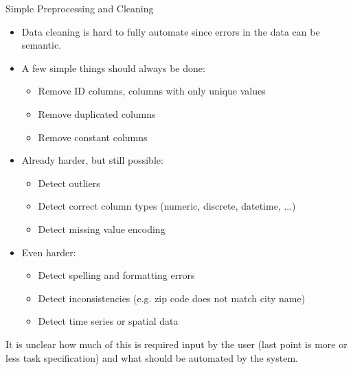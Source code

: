 	\begin{frame}{Simple Preprocessing and Cleaning}
		\begin{itemize}
			\item Data cleaning is hard to fully automate since errors in the data can be semantic.
			\item A few simple things should always be done:
			\begin{itemize}
				\item Remove ID columns, columns with only unique values
				\item Remove duplicated columns
				\item Remove constant columns
			\end{itemize}
			\item Already harder, but still possible:
			\begin{itemize}
				\item Detect outliers
				\item Detect correct column types (numeric, discrete, datetime, ...)
				\item Detect missing value encoding
			\end{itemize}
			\item Even harder:
			\begin{itemize}
				\item Detect spelling and formatting errors
				\item Detect inconsistencies (e.g. zip code does not match city name)
				\item Detect time series or spatial data 
			\end{itemize}  
		\end{itemize}

		
		It is unclear how much of this is required input by the user (last point is more or less task specification) and what should be automated by the system. 
		
	\end{frame}

